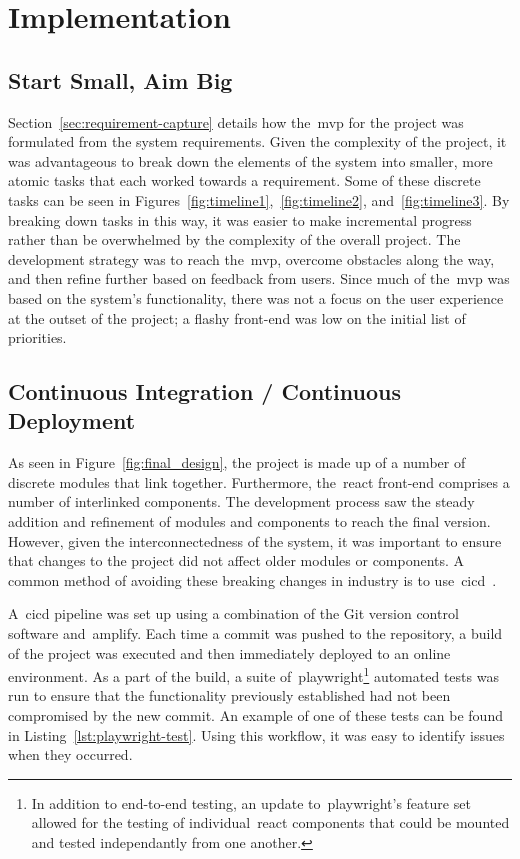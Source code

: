 \thispagestyle{plain}
\newpage
\section{Implementation}\label{sec:implementation}

\normalsize

\subsection{Start Small, Aim Big}\label{subsec:start-small-aim-big}

Section~\ref{sec:requirement-capture} details how the~\gls{mvp} for the project was formulated from the system requirements.
Given the complexity of the project,
it was advantageous to break down the elements of the system into smaller,
more atomic tasks that each worked towards a requirement.
Some of these discrete tasks can be seen in Figures~\ref{fig:timeline1},~\ref{fig:timeline2}, and~\ref{fig:timeline3}.
By breaking down tasks in this way,
it was
easier to make incremental progress
rather than be overwhelmed by the complexity of the overall project.
The development strategy was to reach the~\gls{mvp}, overcome obstacles along the way,
and then refine further based on feedback from users.
Since much of the~\gls{mvp} was based on the system's functionality,
there was not a focus on the user experience at the outset of the project;
a flashy front-end was low on the initial list of priorities.

\subsection{Continuous Integration / Continuous Deployment}\label{subsec:continuous-integration-continuous-deployment}

As seen in Figure~\ref{fig:final_design}, the project is made up of a number of discrete modules that link together.
Furthermore, the~\gls{react} front-end comprises a number of interlinked components.
The development process saw the steady addition and refinement of modules and components to reach the final version.
However, given the interconnectedness of the system,
it was important to ensure that changes to the project did not affect older modules or components.
A common method of avoiding these breaking changes in industry is
to use~\gls{cicd}~\citep{duvall2007continuous, miller-ci}.

A~\gls{cicd} pipeline was set up using a combination of the Git version control software and~\gls{amplify}.
Each time a commit was pushed to the repository,
a build of the project was executed and then immediately deployed to an online environment.
As a part of the build,
a suite of~\gls{playwright}\footnote{In addition to end-to-end testing, an update to~\gls{playwright}'s feature set allowed for the testing of individual~\gls{react} components that could be mounted and tested independantly from one another.} automated tests was run
to ensure that the functionality previously established had not been compromised by the new commit.
An example of one of these tests can be found in Listing~\ref{lst:playwright-test}.
Using this workflow, it was easy to identify issues when they occurred.

